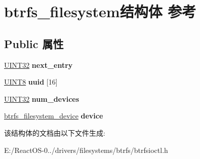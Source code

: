 \hypertarget{structbtrfs__filesystem}{}\section{btrfs\+\_\+filesystem结构体 参考}
\label{structbtrfs__filesystem}
\subsection*{Public 属性}
\begin{DoxyCompactItemize}
\item 
\mbox{\label{structbtrfs__filesystem_ab54b537eea12c145a09423d79e7c7ea8}} 
\hyperlink{_processor_bind_8h_ae1e6edbbc26d6fbc71a90190d0266018}{U\+I\+N\+T32} {\bfseries next\+\_\+entry}
\item 
\mbox{\label{structbtrfs__filesystem_a1a9253c5b1f7e09bea3bf98e259fbb71}} 
\hyperlink{_processor_bind_8h_ab27e9918b538ce9d8ca692479b375b6a}{U\+I\+N\+T8} {\bfseries uuid} \mbox{[}16\mbox{]}
\item 
\mbox{\label{structbtrfs__filesystem_aceaf969f17e4f25c28d476c0cf4f25e3}} 
\hyperlink{_processor_bind_8h_ae1e6edbbc26d6fbc71a90190d0266018}{U\+I\+N\+T32} {\bfseries num\+\_\+devices}
\item 
\mbox{\label{structbtrfs__filesystem_a5aad862d6a47d556aa5a0dac4db33989}} 
\hyperlink{structbtrfs__filesystem__device}{btrfs\+\_\+filesystem\+\_\+device} {\bfseries device}
\end{DoxyCompactItemize}


该结构体的文档由以下文件生成\+:\begin{DoxyCompactItemize}
\item 
E\+:/\+React\+O\+S-\/0../drivers/filesystems/btrfs/btrfsioctl.\+h\end{DoxyCompactItemize}
